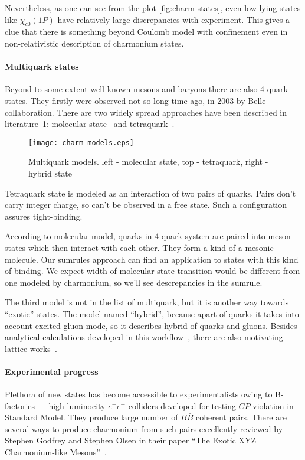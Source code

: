 Nevertheless, as one can see from the plot \cref{fig:charm-states}, even low-lying states like $\chi_{c0}(1P)$ have relatively large discrepancies with experiment. This gives a clue that there is something beyond Coulomb model with confinement even in non-relativistic description of charmonium states.

\paragraph{Multiquark states}
Beyond to some extent well known mesons and baryons there are also 4-quark states. They firstly were observed not so long time ago, in 2003 by Belle collaboration. There are two widely spread approaches have been described in literature~\cref{fig:charm-models}: molecular state~\cite{molecular-model} and tetraquark~\cite{tetraquark-model}.

\begin{figure}[H]
    \centering
    \texttt{[image: charm-models.eps]}
    \caption{Multiquark models. left - molecular state, top - tetraquark, right - hybrid state\label{fig:charm-models}}
\end{figure}

Tetraquark state is modeled as an interaction of two pairs of quarks. Pairs don't carry integer charge, so can't be observed in a free state. Such a configuration assures tight-binding.

According to molecular model, quarks in 4-quark system are paired into meson-states which then interact with each other. They form a kind of a mesonic molecule. Our sumrules approach can find an application to states with this kind of binding. We expect width of molecular state transition would be different from one modeled by charmonium, so we'll see descrepancies in the sumrule.

The third model is not in the list of multiquark, but it is another way towards ``exotic'' states. The model named ``hybrid'', because apart of quarks it takes into account excited gluon mode, so it describes hybrid of quarks and gluons. Besides analytical calculations developed in this workflow~\cite{hybrid-th}, there are also motivating lattice works~\cite{hybrid-lattice1, hybrid-lattice2}. 

\paragraph{Experimental progress}
Plethora of new states has become accessible to experimentalists owing to B-factories --- high-luminocity $e^+ e^-$-colliders developed for testing $CP$-violation in Standard Model. They produce large number of $B\bar{B}$ coherent pairs. There are several ways to produce charmonium from such pairs excellently reviewed by Stephen Godfrey and Stephen Olsen in their paper ``The Exotic XYZ Charmonium-like Mesons''~\cite{godfrey-olsen}.

